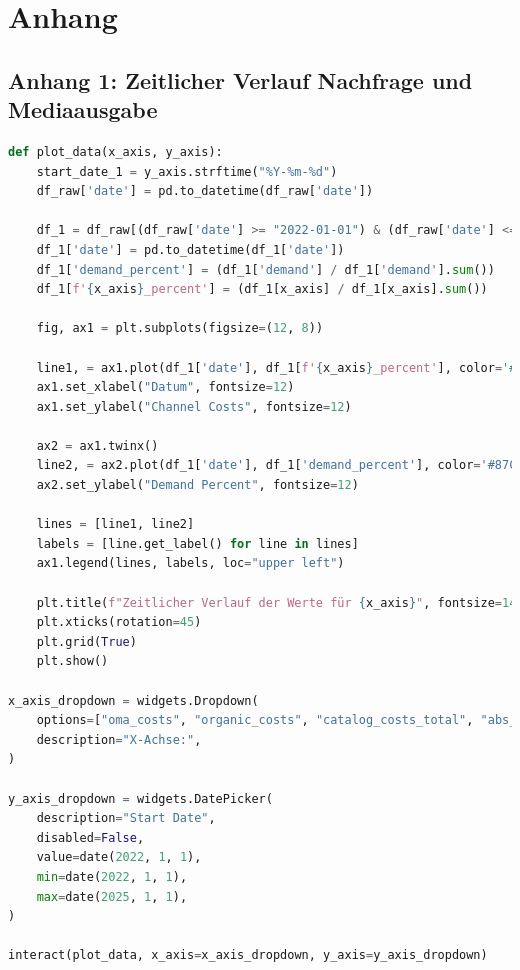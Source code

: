\documentclass{common/nak}
\numberwithin{equation}{subsection}
\begin{document}
\newpage
\appendix
\section*{Anhang}
\label{anhang}

\subsection*{Anhang 1: Zeitlicher Verlauf Nachfrage und Mediaausgabe}
\label{Anhang1:ZeitlicherVerlaufMitPywidgets}
\UseRawInputEncoding
\begin{lstlisting}[language=Python, linewidth=\textwidth]
    def plot_data(x_axis, y_axis):
    start_date_1 = y_axis.strftime("%Y-%m-%d")
    df_raw['date'] = pd.to_datetime(df_raw['date'])
    
    df_1 = df_raw[(df_raw['date'] >= "2022-01-01") & (df_raw['date'] <= "2025-01-01")].copy() 
    df_1['date'] = pd.to_datetime(df_1['date'])
    df_1['demand_percent'] = (df_1['demand'] / df_1['demand'].sum())
    df_1[f'{x_axis}_percent'] = (df_1[x_axis] / df_1[x_axis].sum())
    
    fig, ax1 = plt.subplots(figsize=(12, 8))
    
    line1, = ax1.plot(df_1['date'], df_1[f'{x_axis}_percent'], color='#FF69B4', label=f"{x_axis}")
    ax1.set_xlabel("Datum", fontsize=12)
    ax1.set_ylabel("Channel Costs", fontsize=12)
    
    ax2 = ax1.twinx()
    line2, = ax2.plot(df_1['date'], df_1['demand_percent'], color='#87CEFA', label="Demand Percent")
    ax2.set_ylabel("Demand Percent", fontsize=12)
    
    lines = [line1, line2]
    labels = [line.get_label() for line in lines]
    ax1.legend(lines, labels, loc="upper left")
    
    plt.title(f"Zeitlicher Verlauf der Werte für {x_axis}", fontsize=14)
    plt.xticks(rotation=45)
    plt.grid(True)
    plt.show()

x_axis_dropdown = widgets.Dropdown(
    options=["oma_costs", "organic_costs", "catalog_costs_total", "abs_discount_value", "sum_vkb", "c_and_a_costs", "h_and_m_costs", "aboutyou_costs", "zalando_costs","mail_newsletter", "mail_trigger", "push_newsletter", "push_trigger""tv_costs", "podcast_costs", "addressable_tv_costs", "radio_costs", "dooh_ooh_costs", "youtube_costs", "olv_costs", "display_media_costs", "social_media_costs", "media_print_costs"],
    description="X-Achse:",
)

y_axis_dropdown = widgets.DatePicker(
    description="Start Date",
    disabled=False,
    value=date(2022, 1, 1),
    min=date(2022, 1, 1),  
    max=date(2025, 1, 1),
)

interact(plot_data, x_axis=x_axis_dropdown, y_axis=y_axis_dropdown)
\end{lstlisting}
\newpage
\end{document}
